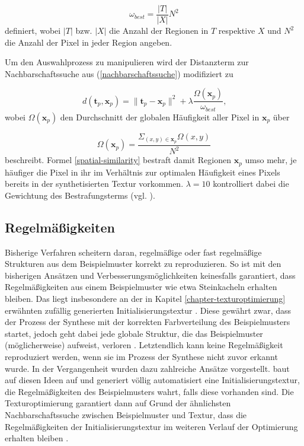 \begin{equation*}
	\omega_{\textit{best}} = \frac{|T|}{|X|}N^2
\end{equation*}
definiert, wobei $|T|$ bzw. $|X|$ die Anzahl der Regionen in $T$ respektive $X$ und $N^2$ die Anzahl der Pixel in jeder Region angeben.

Um den Auswahlprozess zu manipulieren wird der Distanzterm zur Nachbarschaftssuche aus (\ref{nachbarschaftssuche}) modifiziert zu

\begin{equation}
	d(\textbf{t}_p, \textbf{x}_p) = \lVert \textbf{t}_p - \textbf{x}_p \rVert^2 + \lambda \frac{\Omega(\textbf{x}_p)}{\omega_{\textit{best}}}\text{,}
	\label{spatial-similarity}
\end{equation}
wobei $\Omega(\textbf{x}_p)$ den Durchschnitt der globalen Häufigkeit aller Pixel in $\textbf{x}_p$ über

\begin{equation*}
	\Omega(\textbf{x}_p) = \frac{\Sigma_{(x,y) \in \textbf{x}_p}\Omega(x,y)}{N^2}
\end{equation*}
beschreibt.
Formel \ref{spatial-similarity} bestraft damit Regionen $\textbf{x}_p$ umso mehr, je häufiger die Pixel in ihr im Verhältnis zur optimalen Häufigkeit eines Pixels bereits in der synthetisierten Textur vorkommen.
$\lambda = 10$ kontrolliert dabei die Gewichtung des Bestrafungsterms (vgl. \cite{SelfTuning}).

\subsection{Regelmäßigkeiten}

Bisherige Verfahren scheitern daran, regelmäßige oder fast regelmäßige Strukturen aus dem Beispielmuster korrekt zu reproduzieren.
So ist mit den bisherigen Ansätzen und Verbesserungsmöglichkeiten keinesfalls garantiert, dass Regelmäßigkeiten aus einem Beispielmuster wie etwa Steinkacheln erhalten bleiben.
Das liegt insbesondere an der in Kapitel \ref{chapter-texturoptimierung} erwähnten zufällig generierten Initialisierungstextur \cite{SelfTuning}.
Diese gewährt zwar, dass der Prozess der Synthese mit der korrekten Farbverteilung des Beispielmusters startet, jedoch geht dabei jede globale Struktur, die das Beispielmuster (möglicherweise) aufweist, verloren \cite{SelfTuning}.
Letztendlich kann keine Regelmäßigkeit reproduziert werden, wenn sie im Prozess der Synthese nicht zuvor erkannt wurde.
In der Vergangenheit wurden dazu zahlreiche Ansätze vorgestellt.
\cite{SelfTuning} baut auf diesen Ideen auf und generiert völlig automatisiert eine  Initialisierungstextur, die Regelmäßigkeiten des Beispielmusters wahrt, falls diese vorhanden sind.
Die Texturoptimierung garantiert dann auf Grund der ähnlichsten Nachbarschaftssuche zwischen Beispielmuster und Textur, dass die Regelmäßigkeiten der Initialisierungstextur im weiteren Verlauf der Optimierung erhalten bleiben \cite{SelfTuning}.

